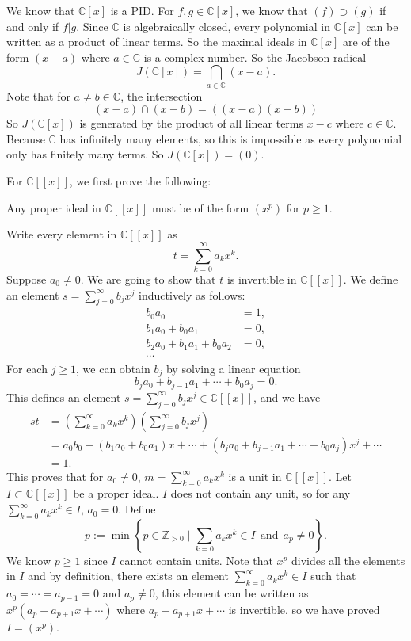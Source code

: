 \documentclass[a4paper, 12pt]{article}
\begin{document}
\begin{solution}
We know that \(\mathbb{C}[x]\) is a PID. For \(f,g\in \mathbb{C}[x]\), we know that \((f)\supset (g)\) if and only if \(f|g\). Since \(\mathbb{C}\) is 
algebraically closed, every polynomial in \(\mathbb{C}[x]\) can be written as a product of linear terms. So the maximal ideals in \(\mathbb{C}[x]\) are of the form 
\((x-a)\) where \(a\in \mathbb{C}\) is a complex number. So the Jacobson radical 
\[J(\mathbb{C}[x])=\bigcap_{a\in \mathbb{C}} (x-a).\]
Note that for \(a\neq b\in \mathbb{C}\), the intersection 
\[(x-a)\cap(x-b)=((x-a)(x-b))\]
So \(J(\mathbb{C}[x])\) is generated by the product of all linear terms \(x-c\) where \(c\in \mathbb{C}\). Because \(\mathbb{C}\) has infinitely many elements, so this is impossible as every polynomial only has finitely many terms. So \(J(\mathbb{C}[x])=(0)\).

For \(\mathbb{C}[[x]]\), we first prove the following:
\begin{claim}
Any proper ideal in \(\mathbb{C}[[x]]\) must be of the form \((x^p)\) for \(p\geq 1\).
\end{claim}
\begin{claimproof}
Write every element in \(\mathbb{C}[[x]]\) as 
\[t=\sum_{k=0}^\infty a_k x^k. \]
Suppose \(a_0\neq 0\). We are going to show that \(t\) is invertible in \(\mathbb{C}[[x]]\). We define an element \(s=\sum_{j=0}^\infty b_jx^j\) inductively as follows: 
\begin{align*}
    b_0a_0&=1,\\
    b_1a_0+b_0a_1&=0,\\ 
    b_2a_0+b_1a_1+b_0a_2&=0,\\ 
    \cdots
\end{align*}
For each \(j\geq 1\), we can obtain \(b_j\) by solving a linear equation 
\[b_ja_0+b_{j-1}a_1+\cdots+b_0a_j=0.\]
This defines an element \(s=\sum_{j=0}^\infty b_jx^j\in \mathbb{C}[[x]]\), and we have 
\begin{align*}
    st&=(\sum_{k=0}^\infty a_kx^k)(\sum_{j=0}^\infty b_jx^j)\\ 
      &=a_0b_0+(b_1a_0+b_0a_1)x+\cdots+(b_ja_0+b_{j-1}a_1+\cdots+b_0a_j)x^j+\cdots\\ 
      &=1.
\end{align*}
This proves that for \(a_0\neq 0\), \(m=\sum_{k=0}^\infty a_kx^k\) is a unit in \(\mathbb{C}[[x]]\). Let \(I\subset \mathbb{C}[[x]]\) be a proper ideal. \(I\) does not contain any unit, so for 
any \(\sum_{k=0}^\infty a_kx^k\in I\), \(a_0=0\). Define 
\[p:=\min \left\{ p \in \mathbb{Z}_{>0}\mid \sum_{k=0}a_kx^k\in I\ \ \text{and}\ \ a_p\neq 0\right\}.\]
We know \(p\geq 1\) since \(I\) cannot contain units. Note that \(x^p\) divides all the elements in \(I\) and by definition, there exists an element \(\sum_{k=0}^\infty a_kx^k\in I\) such that \(a_0=\cdots=a_{p-1}=0\) and \(a_p\neq 0\), this element 
can be written as \(x^p(a_p+a_{p+1}x+\cdots)\) where \(a_p+a_{p+1}x+\cdots\) is invertible, so we have proved \(I=(x^p)\). 
\end{claimproof}


\end{solution}
\end{document}
